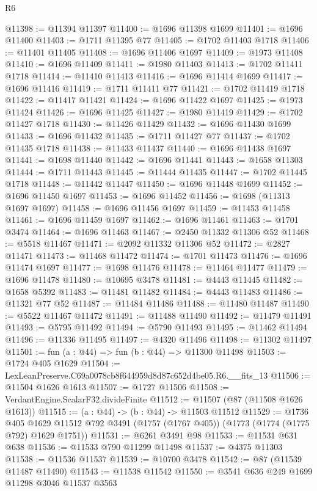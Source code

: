 \begin{lexlean}{R6}
\begin{coremodule}
@11398 := @11394 @11397
@11400 := @1696 @11398 @1699
@11401 := @1696 @11400
@11403 := @1711 @11395 @77
@11405 := @1702 @11403 @1718
@11406 := @11401 @11405
@11408 := @1696 @11406 @1697
@11409 := @1973 @11408
@11410 := @1696 @11409
@11411 := @1980 @11403
@11413 := @1702 @11411 @1718
@11414 := @11410 @11413
@11416 := @1696 @11414 @1699
@11417 := @1696 @11416
@11419 := @1711 @11411 @77
@11421 := @1702 @11419 @1718
@11422 := @11417 @11421
@11424 := @1696 @11422 @1697
@11425 := @1973 @11424
@11426 := @1696 @11425
@11427 := @1980 @11419
@11429 := @1702 @11427 @1718
@11430 := @11426 @11429
@11432 := @1696 @11430 @1699
@11433 := @1696 @11432
@11435 := @1711 @11427 @77
@11437 := @1702 @11435 @1718
@11438 := @11433 @11437
@11440 := @1696 @11438 @1697
@11441 := @1698 @11440
@11442 := @1696 @11441
@11443 := @1658 @11303
@11444 := @1711 @11443
@11445 := @11444 @11435
@11447 := @1702 @11445 @1718
@11448 := @11442 @11447
@11450 := @1696 @11448 @1699
@11452 := @1696 @11450 @1697
@11453 := @1696 @11452
@11456 := @1698 (@11313 @1697 @1697)
@11458 := @1696 @11456 @1697
@11459 := @11453 @11458
@11461 := @1696 @11459 @1697
@11462 := @1696 @11461
@11463 := @1701 @3474
@11464 := @1696 @11463
@11467 := @2450 @11332 @11306 @52
@11468 := @5518 @11467
@11471 := @2092 @11332 @11306 @52
@11472 := @2827 @11471
@11473 := @11468 @11472
@11474 := @1701 @11473
@11476 := @1696 @11474 @1697
@11477 := @1698 @11476
@11478 := @11464 @11477
@11479 := @1696 @11478
@11480 := @10695 @3478
@11481 := @4443 @11445
@11482 := @1658 @5392
@11483 := @11481 @11482
@11484 := @4443 @11483
@11486 := @11321 @77 @52
@11487 := @11484 @11486
@11488 := @11480 @11487
@11490 := @5522 @11467 @11472
@11491 := @11488 @11490
@11492 := @11479 @11491
@11493 := @5795 @11492
@11494 := @5790 @11493
@11495 := @11462 @11494
@11496 := @11336 @11495
@11497 := @4320 @11496
@11498 := @11302 @11497
@11501 := fun (a : @44) => fun (b : @44) => @11300 @11498
@11503 := @1724 @405 @1629
@11504 := LexLeanPreserve.C69a0078cb8f644959d8d87c652d4be05.R6.__fits_13
@11506 := @11504 @1626 @1613
@11507 := @1727 @11506
@11508 := VerdantEngine.ScalarF32.divideFinite
@11512 := @11507 (@87 (@11508 @1626 @1613))
@11515 := (a : @44) -> (b : @44) -> @11503 @11512
@11529 := @1736
    @405
    @1629
    @11512
    @792
    @3491
    (@1757 (@1767 @405))
    (@1773 (@1774 (@1775 @792) @1629 @1751))
@11531 := @6261 @3491 @98
@11533 := @11531 @631 @638
@11536 := @11533 @790 @11299 @11498
@11537 := @4375 @11303
@11538 := @11536 @11537
@11539 := @10700 @3478
@11542 := @87 (@11539 @11487 @11490)
@11543 := @11538 @11542
@11550 := @3541 @636 @249 @1699 @11298 @3046 @11537 @3563

\end{coremodule}
\end{lexlean}
